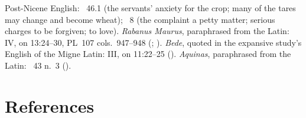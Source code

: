 {Post-Nicene English: \ 46.1 (the servants' anxiety for the
crop; many of the tares may change and become wheat); \ 8
(the complaint a petty matter; serious charges to be forgiven; to love).
\emph{Rabanus Maurus}, paraphrased from the Latin:  IV, on
13:24--30, PL~107 cols.~947--948 (; ). \emph{Bede}, quoted in the expansive study's English of the Migne
Latin:  III, on 11:22--25 (). \emph{Aquinas}, paraphrased from the Latin: \ 43 n.~3 ().

\par}

\section*{References}

